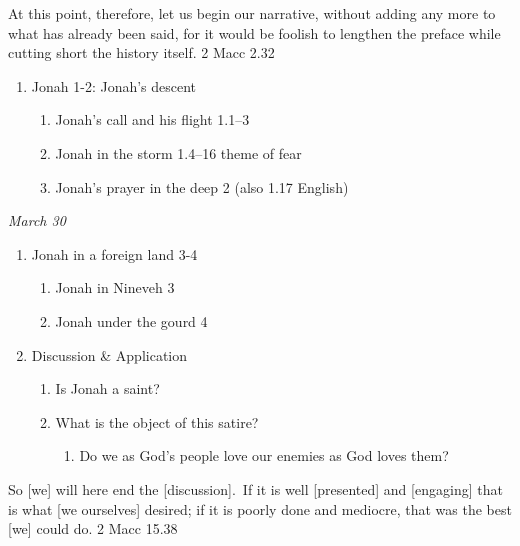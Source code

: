 \documentclass[
]{article}
\begin{document}
At this point, therefore, let us begin our narrative, without adding any
more to what has already been said, for it would be foolish to lengthen
the preface while cutting short the history itself. 2 Macc 2.32

\begin{enumerate}
\def\labelenumi{\arabic{enumi}.}
\item
  Jonah 1-2: Jonah's descent

  \begin{enumerate}
  \def\labelenumii{\arabic{enumii}.}
  \item
    Jonah's call and his flight 1.1--3
  \item
    Jonah in the storm 1.4--16 theme of fear
  \item
    Jonah's prayer in the deep 2 (also 1.17 English)
  \end{enumerate}
\end{enumerate}

\emph{March 30}

\begin{enumerate}
\def\labelenumi{\arabic{enumi}.}
\setcounter{enumi}{1}
\item
  Jonah in a foreign land 3-4

  \begin{enumerate}
  \def\labelenumii{\arabic{enumii}.}
  \item
    Jonah in Nineveh 3
  \item
    Jonah under the gourd 4
  \end{enumerate}
\item
  Discussion \& Application

  \begin{enumerate}
  \def\labelenumii{\arabic{enumii}.}
  \item
    Is Jonah a saint?
  \item
    What is the object of this satire?

    \begin{enumerate}
    \def\labelenumiii{\arabic{enumiii}.}
    \item
      Do we as God's people love our enemies as God loves them?
    \end{enumerate}
  \end{enumerate}
\end{enumerate}

So {[}we{]} will here end the {[}discussion{]}.~If it is well
{[}presented{]} and {[}engaging{]} that is what {[}we ourselves{]}
desired; if it is poorly done and mediocre, that was the best {[}we{]}
could do. 2 Macc 15.38
\end{document}
